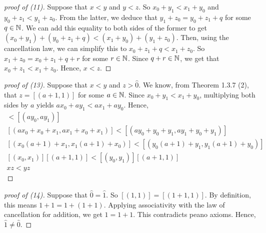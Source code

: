 \begin{proof}[proof of (11)]
    Suppose that \(x < y\) and \(y < z\). So \(x_0 + y_1 < x_1 + y_0\) and \(y_0 + z_1 < y_1 + z_0\). From the latter, we deduce that \(y_1 + z_0 = y_0 + z_1 + q\) for some \(q \in \mathbb{N}\).
    We can add this equality to both sides of the former to get \((x_0 + y_1) + (y_0 + z_1 + q) < (x_1 + y_0) + (y_1 + z_0)\). Then, using the cancellation law, we can simplify this to
    \(x_0 + z_1 + q < x_1 + z_0\). So \(x_1 + z_0 = x_0 + z_1 + q + r\) for some \(r \in \mathbb{N}\). Since \(q+r \in \mathbb{N}\), we get that \(x_0 + z_1 < x_1 + z_0\). Hence, \(x < z\).
\end{proof}
\begin{proof}[proof of (13)]
    Suppose that \(x < y\) and \(z > \hat{0}\). We know, from Theorem 1.3.7 (2), that \(z = [(a+1, 1)]\) for some \(a \in \mathbb{N}\).
    Since \(x_0 + y_1 < x_1 + y_0\), multiplying both sides by \(a\) yields \(ax_0 + ay_1 < ax_1 + ay_0\).
    Hence,
    \begin{gather*}
        [(ax_0, ax_1)] < [(ay_0, ay_1)] \\
        [(ax_0 + x_0 + x_1, ax_1 + x_0 + x_1)] < [(ay_0 + y_0 + y_1, ay_1 + y_0 + y_1)]\\
        [(x_0(a+1)+x_1, x_1(a+1) + x_0)] < [(y_0(a+1) + y_1, y_1(a+1) + y_0)] \\
        [(x_0, x_1)][(a+1, 1)] < [(y_0, y_1)][(a+1, 1)]\\
        xz < yz
    \end{gather*}
\end{proof}
\begin{proof}[proof of (14)]
    Suppose that \(\hat{0} = \hat{1}\). So \([(1,1)] = [(1+1, 1)]\). By definition, this means \(1 + 1 = 1 + (1+1)\). Applying associativity with the law of cancellation for addition, we get \(1 = 1+ 1\). This contradicts peano axioms. Hence, \(\hat{1} \neq \hat{0}\).
\end{proof}


\newpage


